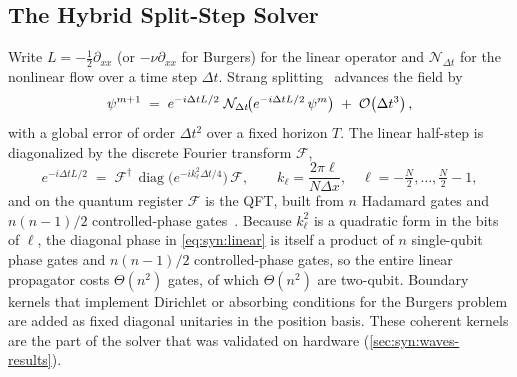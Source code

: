 \subsection{The Hybrid Split-Step Solver}\label{sec:syn:splitstep}

Write $L=-\tfrac12\partial_{xx}$ (or $-\nu\partial_{xx}$ for Burgers) for the linear operator and $\mathcal{N}_{\Delta t}$ for the nonlinear flow over a time step $\Delta t$. Strang splitting~\cite{strang1968splitting} advances the field by
\begin{equation}\label{eq:syn:strang}
  \psi^{m+1} \;=\; e^{-i\Delta t L/2}\;\mathcal{N}_{\Delta t}\!\big(e^{-i\Delta t L/2}\,\psi^{m}\big) \;+\;\mathcal{O}\!\left(\Delta t^{3}\right),
\end{equation}
with a global error of order $\Delta t^{2}$ over a fixed horizon $T$. The linear half-step is diagonalized by the discrete Fourier transform $\mathcal{F}$,
\begin{equation}\label{eq:syn:linear}
  e^{-i\Delta t L/2} \;=\; \mathcal{F}^{\dagger}\,\operatorname{diag}\!\big(e^{-i k_\ell^{2}\Delta t/4}\big)\,\mathcal{F},
  \qquad k_\ell=\frac{2\pi\ell}{N\Delta x},\quad \ell=-\tfrac{N}{2},\dots,\tfrac{N}{2}-1,
\end{equation}
and on the quantum register $\mathcal{F}$ is the QFT, built from $n$ Hadamard gates and $n(n-1)/2$ controlled-phase gates~\cite{nielsen2010qcqi}. Because $k_\ell^{2}$ is a quadratic form in the bits of $\ell$, the diagonal phase in \cref{eq:syn:linear} is itself a product of $n$ single-qubit phase gates and $n(n-1)/2$ controlled-phase gates, so the entire linear propagator costs $\Theta(n^{2})$ gates, of which $\Theta(n^{2})$ are two-qubit. Boundary kernels that implement Dirichlet or absorbing conditions for the Burgers problem are added as fixed diagonal unitaries in the position basis. These coherent kernels are the part of the solver that was validated on hardware (\cref{sec:syn:waves-results}).

